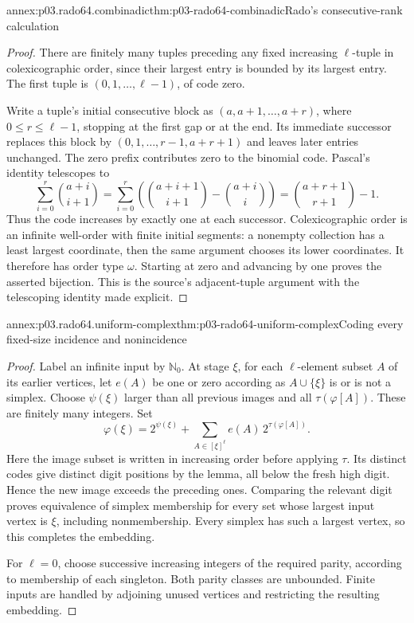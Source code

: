 \begin{annexitem}{annex:p03.rado64.combinadic}{thm:p03-rado64-combinadic}{Rado's consecutive-rank calculation}
\begin{proof}
There are finitely many tuples preceding any fixed increasing
\(\ell\)-tuple in colexicographic order, since their largest entry is
bounded by its largest entry. The first tuple is
\((0,1,\ldots,\ell-1)\), of code zero.

Write a tuple's initial consecutive block as
\((a,a+1,\ldots,a+r)\), where \(0\leq r\leq\ell-1\), stopping at the
first gap or at the end. Its immediate successor replaces this block by
\((0,1,\ldots,r-1,a+r+1)\) and leaves later entries unchanged.
The zero prefix contributes zero to the binomial code.
Pascal's identity telescopes to
\[
 \sum_{i=0}^r\binom{a+i}{i+1}
   =\sum_{i=0}^r
       \left(\binom{a+i+1}{i+1}-\binom{a+i}{i}\right)
   =\binom{a+r+1}{r+1}-1.
\]
Thus the code increases by exactly one at each successor.
Colexicographic order is an infinite well-order with finite initial segments:
a nonempty collection has a least largest coordinate, then the same
argument chooses its lower coordinates. It therefore has order type
\(\omega\). Starting at zero and advancing by one proves the asserted
bijection. This is the source's adjacent-tuple argument with the
telescoping identity made explicit.
\end{proof}
\end{annexitem}

\begin{annexitem}{annex:p03.rado64.uniform-complex}{thm:p03-rado64-uniform-complex}{Coding every fixed-size incidence and nonincidence}
\begin{proof}
Label an infinite input by \(\mathbb N_0\).
At stage \(\xi\), for each \(\ell\)-element subset \(A\) of its earlier
vertices, let \(e(A)\) be one or zero according as
\(A\cup\{\xi\}\) is or is not a simplex.
Choose \(\psi(\xi)\) larger than all previous images and all
\(\tau(\varphi[A])\). These are finitely many integers.
Set
\[
 \varphi(\xi)=2^{\psi(\xi)}
   +\sum_{A\in[\xi]^\ell}e(A)\,2^{\tau(\varphi[A])}.
\]
Here the image subset is written in increasing order before applying
\(\tau\). Its distinct codes give distinct digit positions by the lemma,
all below the fresh high digit. Hence the new image exceeds the preceding
ones. Comparing the relevant digit proves equivalence of simplex membership
for every set whose largest input vertex is \(\xi\), including nonmembership.
Every simplex has such a largest vertex, so this completes the embedding.

For \(\ell=0\), choose successive increasing integers of the required
parity, according to membership of each singleton. Both parity classes
are unbounded. Finite inputs are handled by adjoining unused vertices and
restricting the resulting embedding.
\end{proof}
\end{annexitem}

